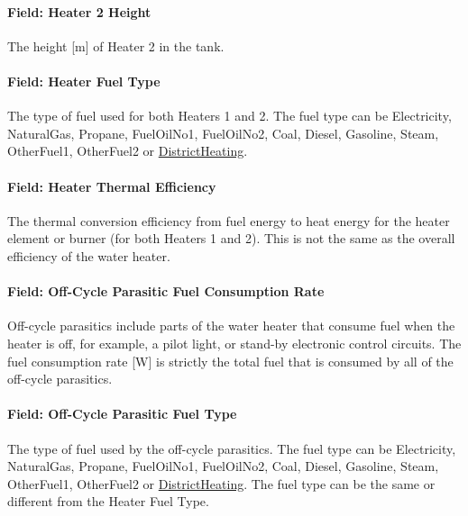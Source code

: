 \paragraph{Field: Heater 2 Height}\label{field-heater-2-height}

The height {[}m{]} of Heater 2 in the tank.

\paragraph{Field: Heater Fuel Type}\label{field-heater-fuel-type-1}

The type of fuel used for both Heaters 1 and 2. The fuel type can be Electricity, NaturalGas, Propane, FuelOilNo1, FuelOilNo2, Coal, Diesel, Gasoline, Steam, OtherFuel1, OtherFuel2 or \hyperref[districtheating]{DistrictHeating}.

\paragraph{Field: Heater Thermal Efficiency}\label{field-heater-thermal-efficiency-1}

The thermal conversion efficiency from fuel energy to heat energy for the heater element or burner (for both Heaters 1 and 2). This is not the same as the overall efficiency of the water heater.

\paragraph{Field: Off-Cycle Parasitic Fuel Consumption Rate}\label{field-off-cycle-parasitic-fuel-consumption-rate-1}

Off-cycle parasitics include parts of the water heater that consume fuel when the heater is off, for example, a pilot light, or stand-by electronic control circuits. The fuel consumption rate {[}W{]} is strictly the total fuel that is consumed by all of the off-cycle parasitics.

\paragraph{Field: Off-Cycle Parasitic Fuel Type}\label{field-off-cycle-parasitic-fuel-type-1}

The type of fuel used by the off-cycle parasitics. The fuel type can be Electricity, NaturalGas, Propane, FuelOilNo1, FuelOilNo2, Coal, Diesel, Gasoline, Steam, OtherFuel1, OtherFuel2 or \hyperref[districtheating]{DistrictHeating}. The fuel type can be the same or different from the Heater Fuel Type.

